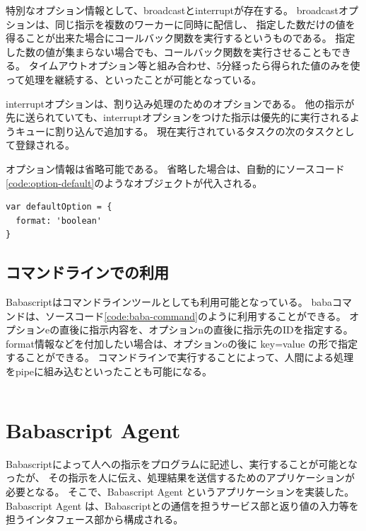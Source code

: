 特別なオプション情報として、broadcastとinterruptが存在する。
broadcastオプションは、同じ指示を複数のワーカーに同時に配信し、
指定した数だけの値を得ることが出来た場合にコールバック関数を実行するというものである。
指定した数の値が集まらない場合でも、コールバック関数を実行させることもできる。
タイムアウトオプション等と組み合わせ、5分経ったら得られた値のみを使って処理を継続する、といったことが可能となっている。

interruptオプションは、割り込み処理のためのオプションである。
他の指示が先に送られていても、interruptオプションをつけた指示は優先的に実行されるようキューに割り込んで追加する。
現在実行されているタスクの次のタスクとして登録される。

オプション情報は省略可能である。
省略した場合は、自動的にソースコード\ref{code:option-default}のようなオブジェクトが代入される。

\begin{lstlisting}[caption=デフォルトのオプション情報, label=code:option-default]
var defaultOption = {
  format: 'boolean'
}
\end{lstlisting}

\subsection{コマンドラインでの利用}\label{ux30b3ux30deux30f3ux30c9ux30e9ux30a4ux30f3ux3067ux306eux5229ux7528}

Babascriptはコマンドラインツールとしても利用可能となっている。
babaコマンドは、ソースコード\ref{code:baba-command}のように利用することができる。
オプションeの直後に指示内容を、オプションnの直後に指示先のIDを指定する。
format情報などを付加したい場合は、オプションoの後に key=value
の形で指定することができる。
コマンドラインで実行することによって、人間による処理をpipeに組み込むといったことも可能になる。

\begin{lstlisting}[caption=Babaコマンド, label=code:baba-command]
% baba -e to_human_message -o format=boolean
\end{lstlisting}

\section{Babascript Agent}\label{babascript-agent}

Babascriptによって人への指示をプログラムに記述し、実行することが可能となったが、
その指示を人に伝え、処理結果を送信するためのアプリケーションが必要となる。
そこで、Babascript Agent というアプリケーションを実装した。 Babascript
Agent
は、Babascriptとの通信を担うサービス部と返り値の入力等を担うインタフェース部から構成される。

